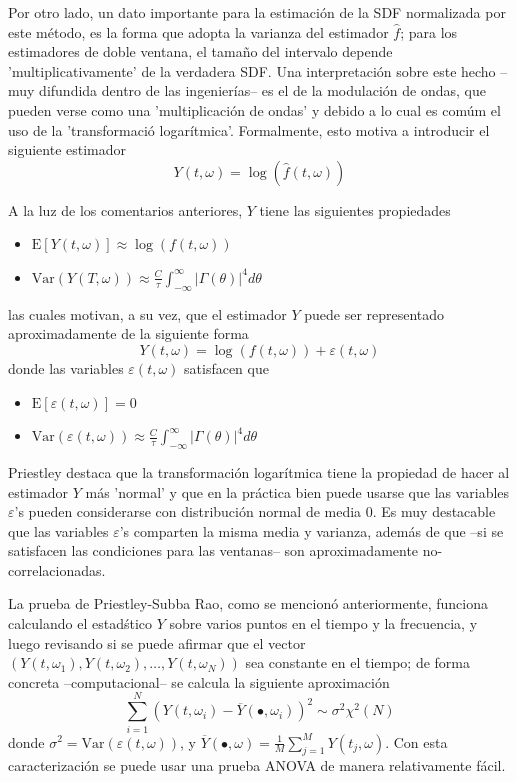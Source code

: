 \documentclass[12pt,a4paper]{mitthesis}
\newcommand{\intR}{\int_{-\infty}^{\infty}}
\newcommand{\est}[1]{\widehat{ #1 }}
\newcommand{\E}[1]{\mathrm{E}\left[ #1 \right]}
\newcommand{\Var}[1]{\mathrm{Var}\left( #1 \right)}
\newcommand{\abso}[1]{\left| #1 \right|}
\begin{document}
Por otro lado, un dato importante para la estimaci\'on de la SDF normalizada por este m\'etodo, es 
la forma que adopta la varianza del estimador $\widehat{f}$; para los estimadores de doble ventana, 
el tama\~no del intervalo depende 'multiplicativamente' de la verdadera SDF.
Una interpretaci\'on sobre este hecho --muy difundida dentro de las ingenier\'ias-- es el de la 
modulaci\'on de ondas, que pueden verse como una 'multiplicaci\'on de ondas' y debido a lo cual es 
com\'um el uso de la 'transformaci\'o logar\'itmica'.
Formalmente, esto motiva a introducir el siguiente estimador
\begin{equation*}
Y(t,\omega) = \log{\left( \est{f}(t,\omega)\right)}
\end{equation*}

A la luz de los comentarios anteriores, $Y$ tiene las siguientes propiedades
\begin{itemize}
\item $\displaystyle 
\E{ Y(t,\omega) } \approx \log \left( f(t,\omega) \right)$
\item $\displaystyle 
\Var{ Y(T,\omega) } 
\approx \frac{C}{\tau} \intR \abso{\Gamma (\theta)}^{4} d\theta $
\end{itemize}
las cuales motivan, a su vez, que el estimador $Y$ puede ser representado aproximadamente de la
siguiente forma
\begin{equation*}
Y(t,\omega) = \log \left( f(t,\omega) \right) + \varepsilon(t,\omega)
\end{equation*}
donde las variables $\varepsilon(t,\omega)$ satisfacen que
\begin{itemize}
\item $\displaystyle \E{\varepsilon(t,\omega)} = 0$
\item $\displaystyle \Var{\varepsilon(t,\omega)}
\approx \frac{C}{\tau} \intR \abso{\Gamma (\theta)}^{4} d\theta$
\end{itemize}

Priestley \cite{Priestley81} destaca que la transformaci\'on logar\'itmica tiene la propiedad de 
hacer al estimador $Y$ m\'as 'normal' y que en la pr\'actica bien puede usarse que las variables 
$\varepsilon$'s pueden considerarse con distribuci\'on normal de media 0.
Es muy destacable que las variables $\varepsilon$'s comparten la misma media y varianza, adem\'as 
de que --si se satisfacen las condiciones para las ventanas-- son aproximadamente 
no-correlacionadas.

La prueba de Priestley-Subba Rao, como se mencion\'o anteriormente, funciona calculando el 
estad\'stico $Y$ sobre varios puntos en el tiempo y la frecuencia, y luego revisando si se puede
afirmar que el vector  $\left( Y(t,\omega_1), Y(t,\omega_2), \dots, Y(t,\omega_N) \right)$ sea 
constante en el tiempo; de forma concreta --computacional-- se calcula la siguiente aproximaci\'on
\begin{equation*}
\sum_{i = 1 }^{N} \left( Y(t,\omega_i) - \overline{Y}(\bullet,\omega_i) \right)^{2} 
\sim \sigma^{2} \chi^{2}(N)
\end{equation*}
donde $\sigma^{2} = \Var{\varepsilon(t,\omega)}$, y
$\overline{Y}(\bullet,\omega) = \frac{1}{M} \sum_{j=1}^{M} Y(t_j,\omega)$.
Con esta caracterizaci\'on se puede usar una prueba ANOVA de manera relativamente f\'acil.
\end{document}
